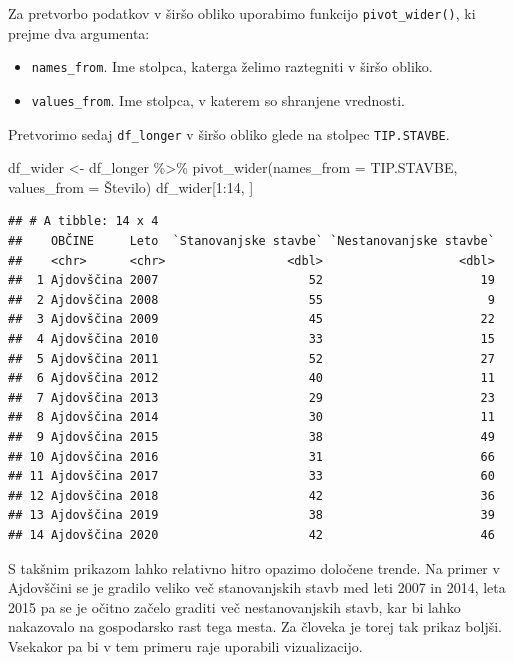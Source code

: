 \documentclass[
]{book}
\newenvironment{Shaded}{\begin{snugshade}}{\end{snugshade}}
\newcommand{\AttributeTok}[1]{\textcolor[rgb]{0.77,0.63,0.00}{#1}}
\newcommand{\DecValTok}[1]{\textcolor[rgb]{0.00,0.00,0.81}{#1}}
\newcommand{\FunctionTok}[1]{\textcolor[rgb]{0.00,0.00,0.00}{#1}}
\newcommand{\NormalTok}[1]{#1}
\newcommand{\OtherTok}[1]{\textcolor[rgb]{0.56,0.35,0.01}{#1}}
\newcommand{\SpecialCharTok}[1]{\textcolor[rgb]{0.00,0.00,0.00}{#1}}
\providecommand{\tightlist}{%
  \setlength{\itemsep}{0pt}\setlength{\parskip}{0pt}}
\begin{document}
Za pretvorbo podatkov v širšo obliko uporabimo funkcijo \texttt{pivot\_wider()}, ki prejme dva argumenta:

\begin{itemize}
\tightlist
\item
  \texttt{names\_from}. Ime stolpca, katerga želimo raztegniti v širšo obliko.
\item
  \texttt{values\_from}. Ime stolpca, v katerem so shranjene vrednosti.
\end{itemize}

Pretvorimo sedaj \texttt{df\_longer} v širšo obliko glede na stolpec \texttt{TIP.STAVBE}.

\begin{Shaded}
\begin{Highlighting}[]
\NormalTok{df\_wider }\OtherTok{\textless{}{-}}\NormalTok{ df\_longer }\SpecialCharTok{\%\textgreater{}\%}
  \FunctionTok{pivot\_wider}\NormalTok{(}\AttributeTok{names\_from =}\NormalTok{ TIP.STAVBE, }\AttributeTok{values\_from =}\NormalTok{ Število)}
\NormalTok{df\_wider[}\DecValTok{1}\SpecialCharTok{:}\DecValTok{14}\NormalTok{, ]}
\end{Highlighting}
\end{Shaded}

\begin{verbatim}
## # A tibble: 14 x 4
##    OBČINE     Leto  `Stanovanjske stavbe` `Nestanovanjske stavbe`
##    <chr>      <chr>                 <dbl>                   <dbl>
##  1 Ajdovščina 2007                     52                      19
##  2 Ajdovščina 2008                     55                       9
##  3 Ajdovščina 2009                     45                      22
##  4 Ajdovščina 2010                     33                      15
##  5 Ajdovščina 2011                     52                      27
##  6 Ajdovščina 2012                     40                      11
##  7 Ajdovščina 2013                     29                      23
##  8 Ajdovščina 2014                     30                      11
##  9 Ajdovščina 2015                     38                      49
## 10 Ajdovščina 2016                     31                      66
## 11 Ajdovščina 2017                     33                      60
## 12 Ajdovščina 2018                     42                      36
## 13 Ajdovščina 2019                     38                      39
## 14 Ajdovščina 2020                     42                      46
\end{verbatim}

S takšnim prikazom lahko relativno hitro opazimo določene trende. Na primer v Ajdovščini se je gradilo veliko več stanovanjskih stavb med leti 2007 in 2014, leta 2015 pa se je očitno začelo graditi več nestanovanjskih stavb, kar bi lahko nakazovalo na gospodarsko rast tega mesta. Za človeka je torej tak prikaz boljši. Vsekakor pa bi v tem primeru raje uporabili vizualizacijo.
\end{document}
